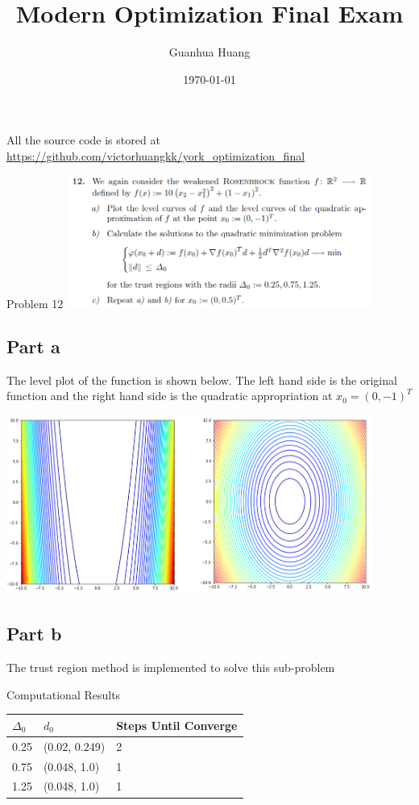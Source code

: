 \documentclass[12pt]{article}
\title{Modern Optimization Final Exam}
\author{Guanhua Huang}
\date\today
\begin{document}
\maketitle %
All the source code is stored at \url{https://github.com/victorhuangkk/york_optimization_final}

\begin{section}{Problem 12}
\includegraphics[width=10cm]{problem12.png}

\subsection{Part a}
The level plot of the function is shown below. The left hand side is the original function and the right hand side is the quadratic appropriation at $x_0 = (0, -1)^T$

\includegraphics[width=12cm]{problem12_plt1.png}


\subsection{Part b}
The trust region method is implemented to solve this sub-problem


Computational Results 


\begin{tabular}{lll}
	\hline
	$\Delta_0$ & $d_0$ & Steps Until Converge \\
	\hline\hline
	0.25 & (0.02, 0.249) & 2 \\
	0.75 & (0.048, 1.0)  & 1 \\
	1.25 & (0.048, 1.0)  & 1
\end{tabular}


\end{section}
\end{document}
